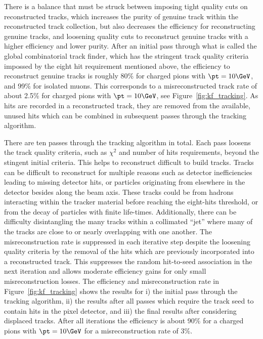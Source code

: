 There is a balance that must be struck between imposing tight quality cuts on reconstructed
tracks, which increases the purity of genuine track within the reconstructed track collection,
but also decreases the efficiency for reconstructing genuine tracks, and loosening
quality cuts to reconstruct genuine tracks with a higher efficiency and lower purity.
After an initial pass through what is called the global combinatorial track finder,
which has the stringent track quality criteria impossed by the eight hit requirement
mentioned above, the efficiency to reconstruct
genuine tracks is roughly 80\% for charged pions with $\pt = 10\GeV$, and 99\%
for isolated muons. This corresponds to a misreconstructed track rate of
about 2.5\% for charged pions with $\pt = 10\GeV$, see Figure~\ref{fig:kf_tracking}.
As hits are recorded in a reconstructed track, they are removed from the available,
unused hits which can be combined in subsequent passes through the tracking algorithm.

There are ten passes through the tracking algorithm in total. Each pass loosens the track quality criteria,
such as $\chi^2$ and number of hits requirements, beyond the stingent initial criteria.
This helps to reconstruct difficult to build tracks. Tracks can be difficult to 
reconstruct for multiple reasons such as detector inefficiencies leading to missing
detector hits, or particles originating from elsewhere in the detector 
besides along the beam axis. These tracks could be from hadrons interacting
within the tracker material before reaching the eight-hits threshold, or from the decay
of particles with finite life-times. Additionally, there can be difficulty disintangling
the many tracks within a collimated ``jet'' where many of the tracks are close to or
nearly overlapping with one another.
The misreconstruction rate is suppressed in each iterative step despite the loosening
quality criteria by the removal of the hits which are previously incorporated into
a reconstructed track. This  suppresses the random hit-to-seed association in the
next iteration and allows moderate efficiency gains for only small misreconstruction losses.
The efficiency and misreconstruction rate in Figure~\ref{fig:kf_tracking} shows the
results for i) the initial pass through the tracking algorithm, ii) the results after all
passes which require the track seed to contain hits in the pixel detector, and iii) the
final results after considering displaced tracks.
After all iterations the efficiency is about 90\% for a charged pions with $\pt = 10\GeV$
for a misreconstruction rate of 3\%.

